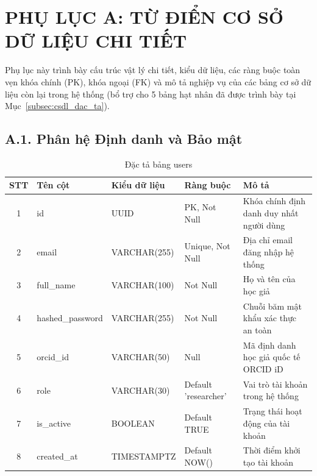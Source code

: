 \cleardoublepage
{}
\chapter*{PHỤ LỤC A: TỪ ĐIỂN CƠ SỞ DỮ LIỆU CHI TIẾT}
\setcounter{table}{0}
\renewcommand{\thetable}{A-\arabic{table}}
\label{ch:phu_luc_csdl}
\setlength{\intextsep}{0.5pt}
\captionsetup{skip=2pt}
\titlespacing*{\chapter}{0pt}{-35pt}{8pt}
\titlespacing*{\section}{0pt}{2pt}{1pt}

Phụ lục này trình bày cấu trúc vật lý chi tiết, kiểu dữ liệu, các ràng buộc toàn vẹn khóa chính (PK), khóa ngoại (FK) và mô tả nghiệp vụ của các bảng cơ sở dữ liệu còn lại trong hệ thống \VS (bổ trợ cho 5 bảng hạt nhân đã được trình bày tại Mục~\ref{subsec:csdl_dac_ta}).

\section*{A.1. Phân hệ Định danh và Bảo mật}

\begin{table}[H]
\centering
\singlespacing
\fontsize{9pt}{11.5pt}\selectfont
\caption{Đặc tả bảng users}
\label{tab:app_users}
\renewcommand{\arraystretch}{0.65}
\begin{tabularx}{\textwidth}{|c|>{\raggedright\arraybackslash}p{3.2cm}|>{\raggedright\arraybackslash}p{2.6cm}|>{\raggedright\arraybackslash}p{3.0cm}|>{\raggedright\arraybackslash}X|}
\hline
\textbf{STT} & \centering\textbf{Tên cột} & \centering\textbf{Kiểu dữ liệu} & \centering\textbf{Ràng buộc} & \centering\textbf{Mô tả} \tabularnewline \hline
1 & id & UUID & PK, Not Null & Khóa chính định danh duy nhất người dùng \tabularnewline \hline
2 & email & VARCHAR(255) & Unique, Not Null & Địa chỉ email đăng nhập hệ thống \tabularnewline \hline
3 & full\_name & VARCHAR(100) & Not Null & Họ và tên của học giả \tabularnewline \hline
4 & hashed\_password & VARCHAR(255) & Not Null & Chuỗi băm mật khẩu xác thực an toàn \tabularnewline \hline
5 & orcid\_id & VARCHAR(50) & Null & Mã định danh học giả quốc tế ORCID iD \tabularnewline \hline
6 & role & VARCHAR(30) & Default 'researcher' & Vai trò tài khoản trong hệ thống \tabularnewline \hline
7 & is\_active & BOOLEAN & Default TRUE & Trạng thái hoạt động của tài khoản \tabularnewline \hline
8 & created\_at & TIMESTAMPTZ & Default NOW() & Thời điểm khởi tạo tài khoản \tabularnewline \hline
\end{tabularx}
\end{table}

